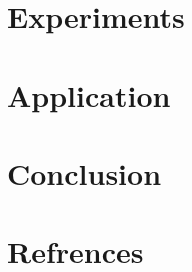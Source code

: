 \documentclass{beamer}
\begin{document}
\section{Experiments}

\section{Application}

\section{Conclusion}

\section{Refrences}
\begin{frame}
\end{frame}
\end{document}
